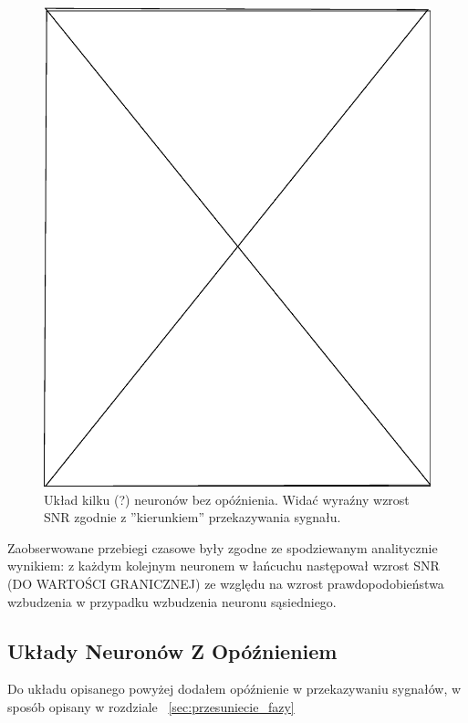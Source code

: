   \begin{figure}
    \includegraphics[width=120mm]{images/pending}
    \caption{Układ kilku (?) neuronów bez opóźnienia. Widać wyraźny wzrost SNR zgodnie z ''kierunkiem'' przekazywania sygnału.}
    \label{fig:graphics:sim:x}
  \end{figure}

  Zaobserwowane przebiegi czasowe były zgodne ze spodziewanym analitycznie wynikiem: z każdym kolejnym neuronem w łańcuchu następował wzrost SNR (DO WARTOŚCI GRANICZNEJ) ze względu na wzrost prawdopodobieństwa wzbudzenia w przypadku wzbudzenia neuronu sąsiedniego.


  
  \subsection{Układy Neuronów Z Opóźnieniem}
  
  Do układu opisanego powyżej dodałem opóźnienie w przekazywaniu sygnałów, w sposób opisany w rozdziale ~\ref{sec:przesuniecie_fazy}

